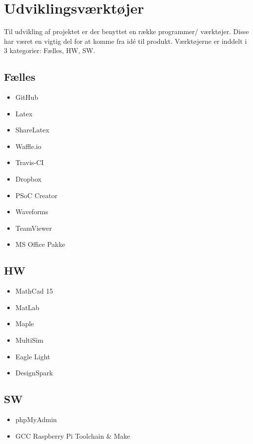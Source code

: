 \section{Udviklingsværktøjer}
Til udvikling af projektet er der benyttet en række programmer/ værktøjer. 
Disse har været en vigtig del for at komme fra idé til produkt. 
Værktøjerne er inddelt i 3 kategorier: Fælles, HW, SW.

\subsection{Fælles}
\begin{itemize}
\item GitHub
\item Latex
\item ShareLatex
\item Waffle.io
\item Travis-CI
\item Dropbox
\item PSoC Creator
\item Waveforms
\item TeamViewer
\item MS Office Pakke
\end{itemize}

\subsection{HW}
\begin{itemize}
\item MathCad 15
\item MatLab
\item Maple
\item MultiSim
\item Eagle Light
\item DesignSpark
\end{itemize}

\subsection{SW} 
\begin{itemize}
\item phpMyAdmin
\item GCC Raspberry Pi Toolchain \& Make
\end{itemize}